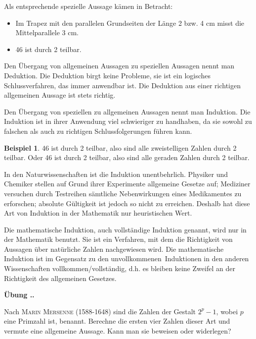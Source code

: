 \documentclass[%
11pt,%
twoside,%
titlepage,%
swissgerman,%
headsepline%
]{scrartcl}
\newcommand{\faEyeLightGray}{\textcolor{lightgray}{\faEye}} %
\newcommand{\definition}[1]{\colorbox{emerald}{#1}}
\theoremstyle{definition}
\newtheorem{bsp}{Beispiel}[subsection] %
\theoremstyle{plain}
\newcommand{\concatueb}[1]{ueb:#1}%
\newcommand{\concatlsg}[1]{lsg:#1}%
\newcounter{uebcounter}[section]
\renewcommand{\theuebcounter}{\thesection.\arabic{uebcounter}}  %
\newenvironment{uebenv}[1]{%
    \refstepcounter{uebcounter}
    \par\noindent\textbf{Übung \theuebcounter.}%
    \label{\concatueb{#1}}\hfill\hyperref[\concatlsg{#1}]{\faEyeLightGray}\par
}{%
    \par
}
\begin{document}
Als entsprechende spezielle Aussage k\"amen in Betracht:
\begin{itemize}
\item Im Trapez mit den parallelen Grundseiten der L\"ange 2 bzw. 4 cm misst die Mittelparallele 3 cm.
\item 46 ist durch 2 teilbar.
\end{itemize}

Den Übergang von allgemeinen Aussagen zu speziellen Aussagen nennt man \definition{Deduktion}. Die Deduktion birgt keine Probleme, sie ist ein logisches Schlussverfahren, das immer anwendbar ist. Die Deduktion aus einer richtigen allgemeinen Aussage ist stets richtig.

Den Übergang von speziellen zu allgemeinen Aussagen nennt man \definition{Induktion}.
Die Induktion ist in ihrer Anwendung viel schwieriger zu handhaben, da sie sowohl zu falschen als auch zu richtigen Schlussfolgerungen f\"uhren kann.

\begin{bsp}
46 ist durch 2 teilbar, also sind alle zweistelligen Zahlen durch 2 teilbar. Oder 46 ist durch 2 teilbar, also sind alle geraden Zahlen durch 2 teilbar.
\end{bsp}

In den Naturwissenschaften ist die Induktion unentbehrlich. Physiker und Chemiker stellen auf Grund ihrer Experimente allgemeine Gesetze auf; Mediziner versuchen durch Testreihen s\"amtliche Nebenwirkungen eines Medikamentes zu erforschen; absolute G\"ul\-tig\-keit ist jedoch so nicht zu erreichen. Deshalb hat diese Art von Induktion in der Mathematik nur heuristischen Wert.

Die mathematische Induktion, auch \definition{vollst\"andige Induktion} genannt, wird nur in der Mathematik benutzt. Sie ist ein Verfahren, mit dem die Richtigkeit von Aussagen \"uber nat\"urliche Zahlen nachgewiesen wird. Die mathematische Induktion ist im Gegensatz zu den \glqq unvollkommenen\grqq\ Induktionen in den anderen Wissenschaften vollkommen/voll\-st\"an\-dig, d.h. es bleiben keine Zweifel an der Richtigkeit des allgemeinen Gesetzes.

\begin{uebenv}{mersenne}
Nach \textsc{Marin Mersenne} (1588-1648) sind die Zahlen der Gestalt $2^p-1$, wobei $p$ eine Primzahl ist, benannt. Berechne die ersten vier Zahlen dieser Art und vermute eine allgemeine Aussage. Kann man sie beweisen oder widerlegen?
\end{uebenv}
\end{document}
